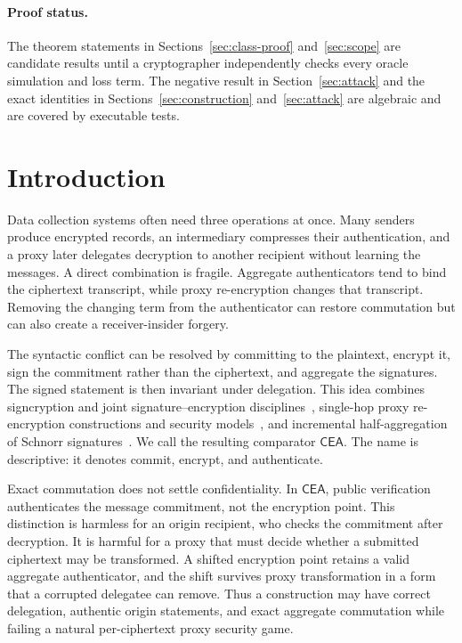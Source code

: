 \documentclass[11pt,letterpaper]{article}
\theoremstyle{definition}
\theoremstyle{remark}
\newcommand{\CEA}{\ensuremath{\mathsf{CEA}}\xspace}
\begin{document}
\tableofcontents
\clearpage
{}

\paragraph{Proof status.}
The theorem statements in
Sections~\ref{sec:class-proof} and~\ref{sec:scope} are candidate results until a
cryptographer independently checks every oracle simulation and loss term.  The
negative result in Section~\ref{sec:attack} and the exact identities in
Sections~\ref{sec:construction} and~\ref{sec:attack} are algebraic and are covered
by executable tests.

\section{Introduction}

Data collection systems often need three operations at once.  Many senders
produce encrypted records, an intermediary compresses their authentication, and
a proxy later delegates decryption to another recipient without learning the
messages.  A direct combination is fragile.  Aggregate authenticators tend to
bind the ciphertext transcript, while proxy re-encryption changes that transcript.
Removing the changing term from the authenticator can restore commutation but can
also create a receiver-insider forgery.

The syntactic conflict can be resolved by committing to the plaintext,
encrypt it, sign the commitment rather than the ciphertext, and aggregate the
signatures.  The signed statement is then invariant under delegation.  This idea
combines signcryption and joint signature--encryption
disciplines~\cite{Zheng97,ADR02}, single-hop proxy re-encryption constructions
and security models~\cite{BBS98,AFGH06,CH07}, and incremental half-aggregation
of Schnorr signatures~\cite{CGKN21,CZ22}.  We call the resulting comparator \CEA.  The
name is descriptive: it denotes commit, encrypt, and authenticate.

Exact commutation does not settle confidentiality.  In \CEA, public verification
authenticates the message commitment, not the encryption point.  This distinction
is harmless for an origin recipient, who checks the commitment after decryption.
It is harmful for a proxy that must decide whether a submitted ciphertext may be
transformed.  A shifted encryption point retains a valid aggregate authenticator,
and the shift survives proxy transformation in a form that a corrupted delegatee
can remove.  Thus a construction may have correct delegation, authentic origin
statements, and exact aggregate commutation while failing a natural
per-ciphertext proxy security game.
\end{document}
